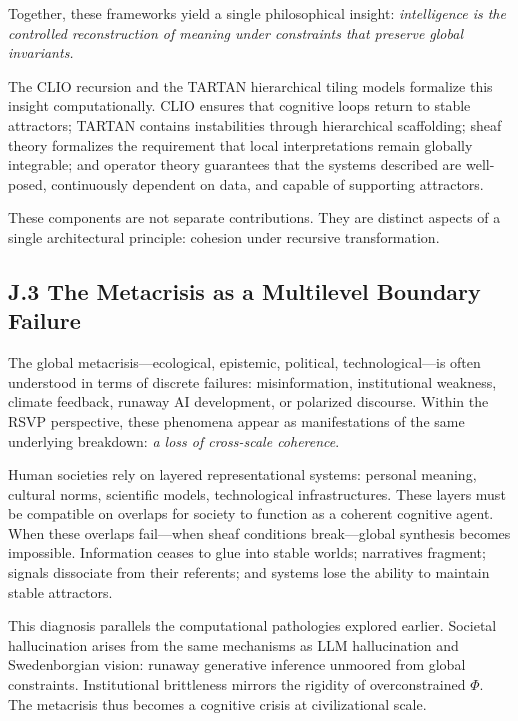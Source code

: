 \documentclass[12pt]{article}
\begin{document}
Together, these frameworks yield a single philosophical insight:  
\emph{intelligence is the controlled reconstruction of meaning under 
constraints that preserve global invariants.}

The CLIO recursion and the TARTAN hierarchical tiling models formalize this 
insight computationally.  
CLIO ensures that cognitive loops return to stable attractors; TARTAN contains 
instabilities through hierarchical scaffolding; sheaf theory formalizes the 
requirement that local interpretations remain globally integrable; and 
operator theory guarantees that the systems described are well-posed, 
continuously dependent on data, and capable of supporting attractors.

These components are not separate contributions.  
They are distinct aspects of a single architectural principle: cohesion under 
recursive transformation.

\subsection*{J.3 The Metacrisis as a Multilevel Boundary Failure}

The global metacrisis—ecological, epistemic, political, technological—is often 
understood in terms of discrete failures: misinformation, institutional 
weakness, climate feedback, runaway AI development, or polarized discourse.  
Within the RSVP perspective, these phenomena appear as manifestations of the 
same underlying breakdown: \emph{a loss of cross-scale coherence}.

Human societies rely on layered representational systems: personal meaning, 
cultural norms, scientific models, technological infrastructures.  
These layers must be compatible on overlaps for society to function as a 
coherent cognitive agent.  
When these overlaps fail—when sheaf conditions break—global synthesis becomes 
impossible.  
Information ceases to glue into stable worlds; narratives fragment; signals 
dissociate from their referents; and systems lose the ability to maintain 
stable attractors.

This diagnosis parallels the computational pathologies explored earlier.  
Societal hallucination arises from the same mechanisms as LLM hallucination 
and Swedenborgian vision: runaway generative inference unmoored from global 
constraints.  
Institutional brittleness mirrors the rigidity of overconstrained $\Phi$.  
The metacrisis thus becomes a cognitive crisis at civilizational scale.
\end{document}
